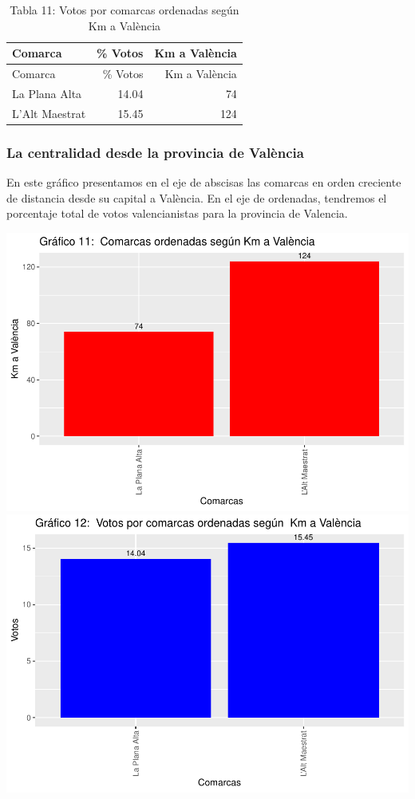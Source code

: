 \documentclass[
]{article}
\begin{document}
\begin{longtable}[]{@{}lrr@{}}
\caption{Tabla 11: Votos por comarcas ordenadas según Km a
València}\tabularnewline
\toprule\noalign{}
Comarca & \% Votos & Km a València \\
\midrule\noalign{}
\endfirsthead
\toprule\noalign{}
Comarca & \% Votos & Km a València \\
\midrule\noalign{}
\endhead
\bottomrule\noalign{}
\endlastfoot
La Plana Alta & 14.04 & 74 \\
L'Alt Maestrat & 15.45 & 124 \\
\end{longtable}

\hypertarget{la-centralidad-desde-la-provincia-de-valuxe8ncia}{%
\subsubsection{La centralidad desde la provincia de
València}\label{la-centralidad-desde-la-provincia-de-valuxe8ncia}}

En este gráfico presentamos en el eje de abscisas las comarcas en orden
creciente de distancia desde su capital a València. En el eje de
ordenadas, tendremos el porcentaje total de votos valencianistas para la
provincia de Valencia.

\includegraphics{votovalencianista-ea2023_page_files/figure-latex/ordenDistanciacapitalValencia-1.pdf}
\includegraphics{votovalencianista-ea2023_page_files/figure-latex/ordenDistanciacapitalValencia-2.pdf}
\end{document}
